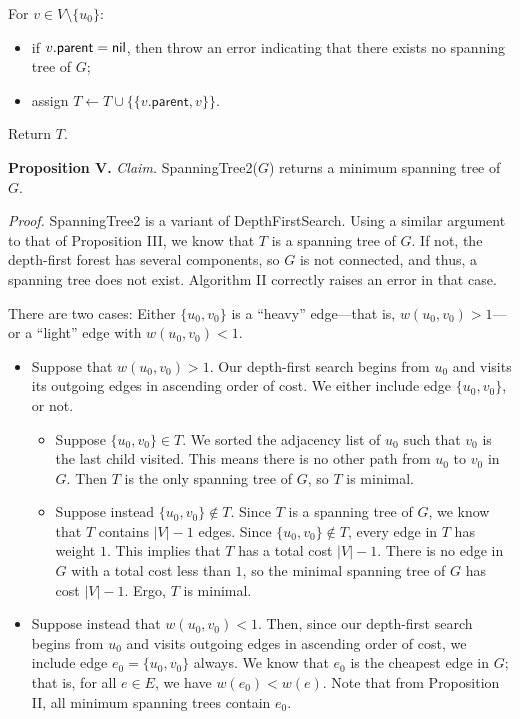 \begin{enumerate}
\begin{solution}
For $v\in V\setminus\{u_0\}$:
\begin{itemize}
\item if $v.\mathsf{parent}=\sf{nil}$, then throw an error indicating that there exists no spanning tree of $G$;
\item assign $T\leftarrow T\cup\{\{v.\mathsf{parent},v\}\}$.
\end{itemize}

Return $T$.

\textbf{Proposition V. }\textit{Claim. }{\sc SpanningTree2}($G$) returns a minimum spanning tree of $G$.

\textit{Proof. }{\sc SpanningTree2} is a variant of {\sc DepthFirstSearch}. Using a similar argument to that of Proposition III, we know that $T$ is a spanning tree of $G$. If not, the depth-first forest has several components, so $G$ is not connected, and thus, a spanning tree does not exist. Algorithm II correctly raises an error in that case.

There are two cases: Either $\{u_0,v_0\}$ is a ``heavy'' edge---that is, $w(u_0,v_0)>1$---or a ``light'' edge with $w(u_0,v_0)<1$.

\begin{itemize}
    \item Suppose that $w(u_0,v_0)>1$. Our depth-first search begins from $u_0$ and visits its outgoing edges in ascending order of cost. We either include edge $\{u_0,v_0\}$, or not.
    \begin{itemize}
        \item Suppose $\{u_0,v_0\}\in T$. We sorted the adjacency list of $u_0$ such that $v_0$ is the last child visited. This means there is no other path from $u_0$ to $v_0$ in $G$. Then $T$ is the only spanning tree of $G$, so $T$ is minimal.
        \item Suppose instead $\{u_0,v_0\}\notin T$. Since $T$ is a spanning tree of $G$, we know that $T$ contains $|V|-1$ edges. Since $\{u_0,v_0\}\notin T$, every edge in $T$ has weight $1$. This implies that $T$ has a total cost $|V|-1$. There is no edge in $G$ with a total cost less than $1$, so the minimal spanning tree of $G$ has cost $|V|-1$. Ergo, $T$ is minimal.
    \end{itemize}
    \item Suppose instead that $w(u_0,v_0)<1$. Then, since our depth-first search begins from $u_0$ and visits outgoing edges in ascending order of cost, we include edge $e_0=\{u_0,v_0\}$ always. We know that $e_0$ is the cheapest edge in $G$; that is, for all $e\in E$, we have $w(e_0)<w(e)$. Note that from Proposition II, all minimum spanning trees contain $e_0$.
    

\end{itemize}
\end{solution}
\end{enumerate}
